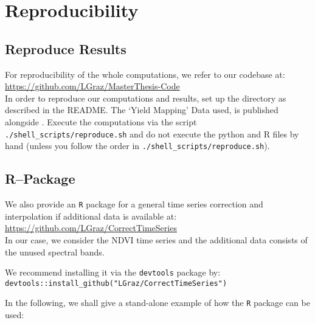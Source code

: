 \chapter{Reproducibility}\label{app:reproducibility}

\section{Reproduce Results}
For reproducibility of the whole computations, we refer to our codebase at:\\ \url{https://github.com/LGraz/MasterThesis-Code}\\ In order to reproduce our computations and results, set up the directory as described in the README. The `Yield Mapping' Data used, is published alongside \cite{perichPixelbasedCropYield2022}. Execute the computations via the script \texttt{./shell\_scripts/reproduce.sh} and do not execute the python and R files by hand (unless you follow the order in \texttt{./shell\_scripts/reproduce.sh}). 

\section{R--Package}
We also provide an \texttt{R} package for a general time series correction and interpolation if additional data is available at: \\
\url{https://github.com/LGraz/CorrectTimeSeries} \\
In our case, we consider the NDVI time series and the additional data consists of the unused spectral bands.

We recommend installing it via the \texttt{devtools} package by:\\
\texttt{devtools::install\_github("LGraz/CorrectTimeSeries")}

In the following, we shall give a stand-alone example of how the \texttt{R} package can be used:



